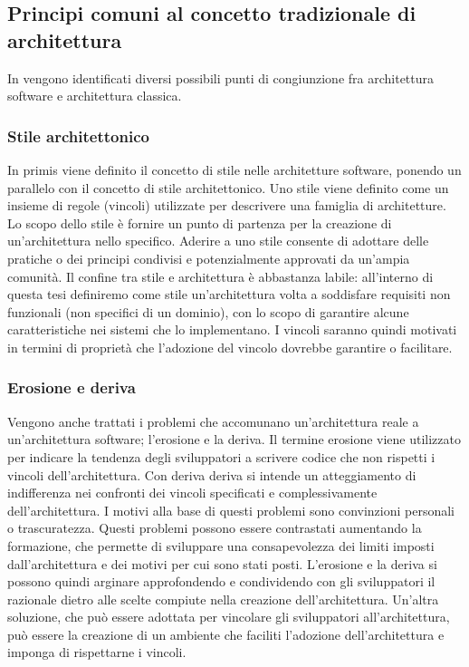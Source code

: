 \documentclass[12pt]{report}
\begin{document}
\subsection{Principi comuni al concetto tradizionale di architettura}
In \cite{perry_foundations_1992} vengono identificati diversi possibili punti di congiunzione fra architettura software e architettura classica.
\subsubsection{Stile architettonico}\label{stile architettonico}
In primis viene definito il concetto di stile nelle architetture software, ponendo un parallelo con il concetto di stile architettonico. 
Uno stile viene definito come un insieme di regole (vincoli) utilizzate per descrivere una famiglia di architetture. 
Lo scopo dello stile è fornire un punto di partenza per la creazione di un'architettura nello specifico.
Aderire a uno stile consente di adottare delle pratiche o dei principi condivisi e potenzialmente approvati da un'ampia comunità. 
Il confine tra stile e architettura è abbastanza labile: all'interno di questa tesi definiremo come stile un'architettura volta a soddisfare requisiti non funzionali (non specifici di un dominio), con lo scopo di garantire alcune caratteristiche nei sistemi che lo implementano. 
I vincoli saranno quindi motivati in termini di proprietà che l'adozione del vincolo dovrebbe garantire o facilitare.
\subsubsection{Erosione e deriva}\label{erosione e deriva}

Vengono anche trattati i problemi che accomunano un'architettura reale a un'architettura software; l'erosione e la deriva.
Il termine erosione viene utilizzato per indicare la tendenza degli sviluppatori a scrivere codice che non rispetti i vincoli dell'architettura.
Con deriva deriva si intende un atteggiamento di indifferenza nei confronti dei vincoli specificati e complessivamente dell'architettura.
I motivi alla base di questi problemi sono convinzioni personali o trascuratezza.
Questi problemi possono essere contrastati aumentando la formazione, che permette di sviluppare una consapevolezza dei limiti imposti dall'architettura e dei motivi per cui sono stati posti.
L'erosione e la deriva si possono quindi arginare approfondendo e condividendo con gli sviluppatori il razionale dietro alle scelte compiute nella creazione dell'architettura.
Un'altra soluzione, che può essere adottata per vincolare gli sviluppatori all'architettura, può essere la creazione di un ambiente che faciliti l'adozione dell'architettura e imponga di rispettarne i vincoli.
\end{document}
